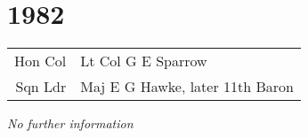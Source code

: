 \chapter*{1982}

\begin{center}
  \small
  \begin{tabular}{rl}
    Hon Col & Lt Col G E Sparrow \\
    Sqn Ldr & Maj E G Hawke, later 11th Baron \\
  \end{tabular}
\end{center}

\begin{center}
  \textit{No further information}
\end{center}

\vspace{50mm}

\pagebreak
